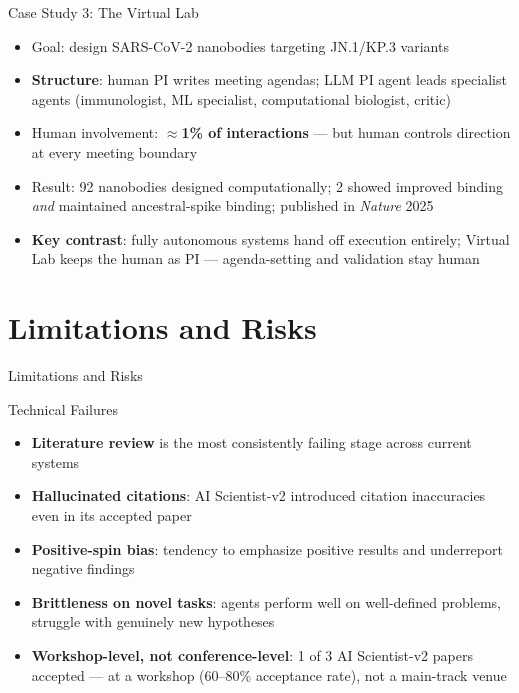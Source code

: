 \documentclass[aspectratio=169]{beamer}
\begin{document}
\begin{frame}{Case Study 3: The Virtual Lab}
  \begin{itemize}
    \item Goal: design SARS-CoV-2 nanobodies targeting JN.1/KP.3 variants \citep{swanson2024virtuallab}
    \item \textbf{Structure}: human PI writes meeting agendas; LLM PI agent leads specialist agents (immunologist, ML specialist, computational biologist, critic)
    \item Human involvement: $\approx$\textbf{1\% of interactions} --- but human controls direction at every meeting boundary
    \item Result: 92 nanobodies designed computationally; 2 showed improved binding \textit{and} maintained ancestral-spike binding; published in \textit{Nature} 2025
    \item \textbf{Key contrast}: fully autonomous systems hand off execution entirely; Virtual Lab keeps the human as PI --- agenda-setting and validation stay human
  \end{itemize}
\end{frame}

\section{Limitations and Risks}

\begin{frame}{}
  \centering
  \Large Limitations and Risks
\end{frame}

\begin{frame}{Technical Failures}
  \begin{itemize}
    \item \textbf{Literature review} is the most consistently failing stage across current systems \citep{schmidgall2025agenticscience}
    \item \textbf{Hallucinated citations}: AI Scientist-v2 introduced citation inaccuracies even in its accepted paper \citep{yamada2025aiscientistv2}
    \item \textbf{Positive-spin bias}: tendency to emphasize positive results and underreport negative findings \citep{yamada2025aiscientistv2}
    \item \textbf{Brittleness on novel tasks}: agents perform well on well-defined problems, struggle with genuinely new hypotheses \citep{feng2026visionary}
    \item \textbf{Workshop-level, not conference-level}: 1 of 3 AI Scientist-v2 papers accepted --- at a workshop (60--80\% acceptance rate), not a main-track venue \citep{yamada2025aiscientistv2}
  \end{itemize}
\end{frame}
\end{document}
